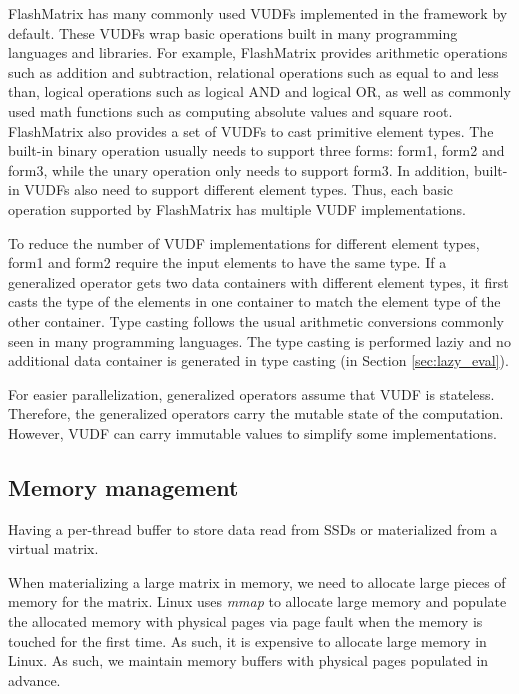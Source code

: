 FlashMatrix has many commonly used VUDFs implemented in the framework by default.
These VUDFs wrap basic operations built in many programming languages and
libraries. For example, FlashMatrix provides arithmetic operations such as addition
and subtraction, relational operations such as equal to and less than, logical
operations such as logical AND and logical OR, as well as commonly used
math functions such as computing absolute values and square root. FlashMatrix
also provides a set of VUDFs to cast primitive element types. The built-in
binary operation usually needs to support three forms: form1, form2 and form3,
while the unary operation only needs to support form3. In addition, built-in
VUDFs also need to support different element types. Thus, each basic operation
supported by FlashMatrix has multiple VUDF implementations.


To reduce the number of VUDF implementations for different element types, form1
and form2 require the input elements to have the same type. If a generalized
operator gets two data containers with different element types, it first casts
the type of the elements in one container to match the element type of the other
container. Type casting follows the usual arithmetic conversions \cite{}
commonly seen in many programming languages. The type casting is performed
laziy and no additional data container is generated in type casting
(in Section \ref{sec:lazy_eval}).

For easier parallelization, generalized operators assume that VUDF is stateless.
Therefore, the generalized operators carry the mutable state of the computation.
However, VUDF can carry immutable values to simplify some implementations.

\subsection{Memory management}


Having a per-thread buffer to store data read from SSDs or materialized from
a virtual matrix.

When materializing a large matrix in memory, we need to allocate large pieces
of memory for the matrix. Linux uses \textit{mmap} to allocate large memory
and populate the allocated memory with physical pages via page fault when
the memory is touched for the first time. As such, it is expensive to allocate
large memory in Linux. As such, we maintain memory buffers with physical pages
populated in advance.

